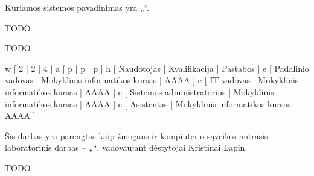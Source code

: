 Kuriamos sistemos pavadinimas yra „\systemname“.

TODO

TODO

\xtable
{
  w [ 2 | 2 | 4 ]
  a [ p | p | p ]
  h [ Naudotojas | Kvalifikacija | Pastabos ]
  e [ Padalinio vadovas | Mokyklinis informatikos kursas
  | AAAA
  ]
  e [ IT vadovas | Mokyklinis informatikos kursas
  | AAAA
  ]
  e [ Sistemos administratorius | Mokyklinis informatikos kursas
  | AAAA
  ]
  e [ Asistentas | Mokyklinis informatikos kursas
  | AAAA
  ]
}

Šis darbas yra parengtas kaip žmogaus ir kompiuterio sąveikos antrasis laboratorinis darbas
– „\docname“, vadovaujant dėstytojai Kristinai Lapin.

TODO
